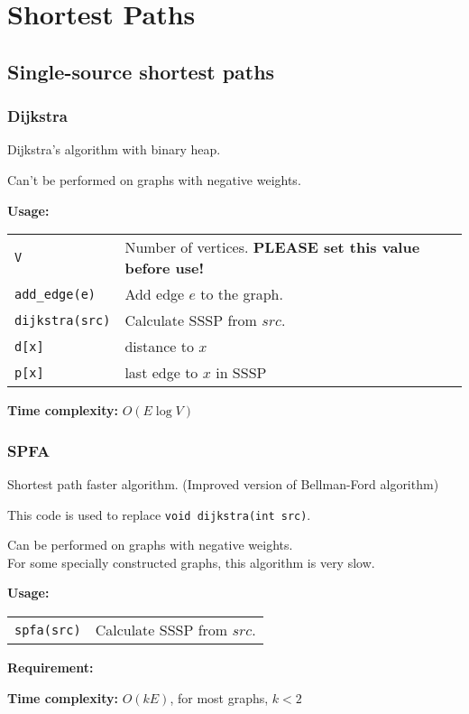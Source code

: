 
\newcommand{\BookNo}{1}
\newcommand{\BookTitle}{Graph Theory}


\setmainfont{Times New Roman}
\setlength{\parskip}{0.0in}
\tableofcontents
\setlength{\parskip}{0.1in}
\newevenpage
\section{Shortest Paths}

\subsection{Single-source shortest paths}
\subsubsection{Dijkstra} \label{dijkstra}
Dijkstra's algorithm with binary heap. \par
\Cross Can't be performed on graphs with negative weights.\par
\textbf{Usage:} \\[0.1cm]
\begin{tabular}{p{2.5cm} p{9cm}}
  \lstinline|V| & Number of vertices. \textbf{PLEASE set this value before use!} \\
  \lstinline|add_edge(e)| & Add edge $e$ to the graph. \\
  \lstinline|dijkstra(src)| & Calculate SSSP from $src$.  \\
  \lstinline|d[x]| & distance to $x$ \\
  \lstinline|p[x]| & last edge to $x$ in SSSP  \\
\end{tabular} \par
\textbf{Time complexity:} $O(E \log V)$ \par


\subsubsection{SPFA}
Shortest path faster algorithm. (Improved version of Bellman-Ford algorithm) \par
This code is used to replace \lstinline|void dijkstra(int src)|. \par
\Tick Can be performed on graphs with negative weights. \\
\Warning For some specially constructed graphs, this algorithm is very slow. \par
\textbf{Usage:} \\[0.1cm]
\begin{tabular}{p{2.5cm} p{9cm}}
  \lstinline|spfa(src)| & Calculate SSSP from $src$.  \\
\end{tabular} \par
\textbf{Requirement:} \\
 \par
\textbf{Time complexity:} $O(kE)$, for most graphs, $k<2$ \par


